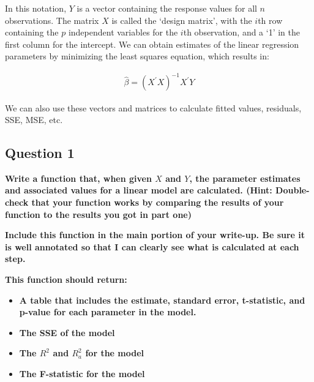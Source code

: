 \documentclass{article}
\begin{document}
In this notation, $Y$ is a vector containing the response values for all
$n$ observations. The matrix $X$ is called the `design matrix', with the
$i$th row containing the $p$ independent variables for the $i$th
observation, and a `1' in the first column for the intercept. We can
obtain estimates of the linear regression parameters by minimizing the
least squares equation, which results in:

\begin{equation*}
    \begin{aligned}
        \hat{\beta} = {\left( X^\prime X \right)}^{-1} X^\prime Y
    \end{aligned}
\end{equation*}

We can also use these vectors and matrices to calculate fitted values,
residuals, SSE, MSE, etc.


    \subsection{Question 1}


    \textbf{Write a function that, when given $X$ and $Y$, the parameter
estimates and associated values for a linear model are calculated.
(Hint: Double-check that your function works by comparing the results of
your function to the results you got in part one)}

\textbf{Include this function in the main portion of your write-up. Be
sure it is well annotated so that I can clearly see what is calculated
at each step.}

\textbf{This function should return:}

\begin{itemize}
\itemsep1pt\parskip0pt
\item
  \textbf{A table that includes the estimate, standard error,
  t-statistic, and p-value for each parameter in the model.}
\item
  \textbf{The SSE of the model}
\item
  \textbf{The $R^2$ and $R^2_a$ for the model}
\item
  \textbf{The F-statistic for the model}
\end{itemize}
\end{document}

